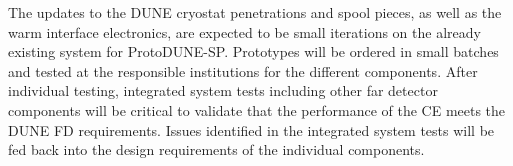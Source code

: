 The updates to the DUNE cryostat penetrations and spool pieces, as well as the warm interface electronics, are expected to be small iterations on the already existing system for ProtoDUNE-SP.  Prototypes will be ordered in small batches and tested at the responsible institutions for the different components.  After individual testing, integrated system tests including other far detector components will be critical to validate that the performance of the CE meets the DUNE FD requirements.  Issues identified in the integrated system tests will be fed back into the design requirements of the individual components.
